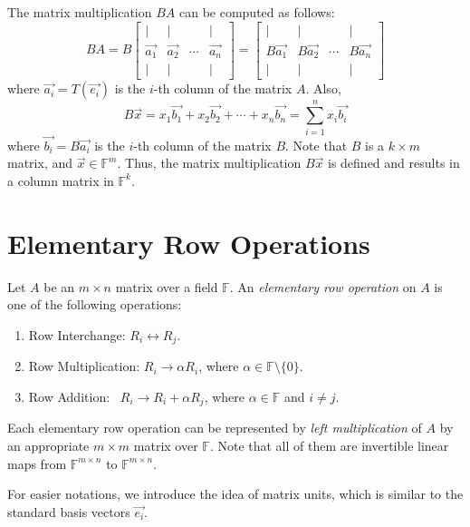\documentclass[
	11pt, %
	fleqn, %
	a4paper, %
]{LegrandOrangeBook}
\newcommand{\F}{\mathbb{F}} %
\begin{document}
The matrix multiplication $BA$ can be computed as follows:
\[
    BA = B\begin{bmatrix}
        | & | & & | \\
        \vec{a_1} & \vec{a_2} & \cdots & \vec{a_n} \\
        | & | & & |
    \end{bmatrix} = \begin{bmatrix}
        | & | & & | \\
        B\vec{a_1} & B\vec{a_2} & \cdots & B\vec{a_n} \\
        | & | & & |
    \end{bmatrix}
\]
where $\vec{a_i} = T(\vec{e_i})$ is the $i$-th column of the matrix $A$. Also, 
\[
    B\vec{x} = x_1 \vec{b_1} + x_2 \vec{b_2} + \cdots + x_n \vec{b_n} = \sum_{i=1}^{n} x_i \vec{b_i}
\]
where $\vec{b_i} = B\vec{a_i}$ is the $i$-th column of the matrix $B$. Note that $B$ is a $k \times m$ matrix, and $\vec{x} \in \F^m$. Thus, the matrix multiplication $B\vec{x}$ is defined and results in a column matrix in $\F^k$.

\newpage

\section{Elementary Row Operations}

\begin{definition}
    Let $A$ be an $m \times n$ matrix over a field $\F$. An \emph{elementary row operation} on $A$ is one of the following operations:
    \begin{enumerate}
        \item Row Interchange: \qquad $R_i \leftrightarrow R_j$.
        \item Row Multiplication: \quad $R_i \to \alpha R_i$, where $\alpha \in \F \setminus \{0\}$.
        \item Row Addition: \qquad\quad\ $R_i \to R_i + \alpha R_j$, where $\alpha \in \F$ and $i \neq j$.
    \end{enumerate}
    Each elementary row operation can be represented by \emph{left multiplication} of $A$ by an appropriate $m \times m$ matrix over $\F$. Note that all of them are invertible linear maps from $\F^{m \times n}$ to $\F^{m \times n}$.
\end{definition}

For easier notations, we introduce the idea of matrix units, which is similar to the standard basis vectors $\vec{e_i}$.
\end{document}
